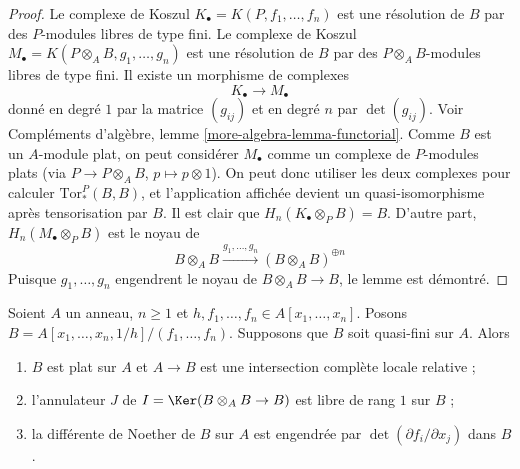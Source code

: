 \begin{proof}
Le complexe de Koszul $K_\bullet = K(P, f_1, \ldots, f_n)$ est une résolution
de $B$ par des $P$-modules libres de type fini. Le complexe de Koszul
$M_\bullet = K(P \otimes_A B, g_1, \ldots, g_n)$ est une résolution
de $B$ par des $P \otimes_A B$-modules libres de type fini. Il existe un morphisme de
complexes
$$
K_\bullet \longrightarrow M_\bullet
$$
donné en degré $1$ par la matrice $(g_{ij})$ et
en degré $n$ par $\det(g_{ij})$. Voir
Compléments d'algèbre, lemme \ref{more-algebra-lemma-functorial}.
Comme $B$ est un $A$-module plat, on peut considérer $M_\bullet$ comme un complexe
de $P$-modules plats (via $P \to P \otimes_A B$, $p \mapsto p \otimes 1$).
On peut donc utiliser les deux complexes pour calculer $\text{Tor}_*^P(B, B)$,
et l'application affichée devient un quasi-isomorphisme après tensorisation
par $B$. Il est clair que $H_n(K_\bullet \otimes_P B) = B$.
D'autre part, $H_n(M_\bullet \otimes_P B)$ est le noyau de
$$
B \otimes_A B \xrightarrow{g_1, \ldots, g_n} (B \otimes_A B)^{\oplus n}
$$
Puisque $g_1, \ldots, g_n$ engendrent le noyau de $B \otimes_A B \to B$,
le lemme est démontré.
\end{proof}

\begin{lemma}
\label{lemma-quasi-finite-complete-intersection}
Soient $A$ un anneau, $n \geq 1$ et
$h, f_1, \ldots, f_n \in A[x_1, \ldots, x_n]$.
Posons $B = A[x_1, \ldots, x_n, 1/h]/(f_1, \ldots, f_n)$.
Supposons que $B$ soit quasi-fini sur $A$.
Alors
\begin{enumerate}
\item $B$ est plat sur $A$ et $A \to B$ est une intersection complète locale
relative ;
\item l'annulateur $J$ de $I = \Ker(B \otimes_A B \to B)$
est libre de rang $1$ sur $B$ ;
\item la différente de Noether de $B$ sur $A$ est engendrée
par $\det(\partial f_i/\partial x_j)$ dans $B$.
\end{enumerate}
\end{lemma}

